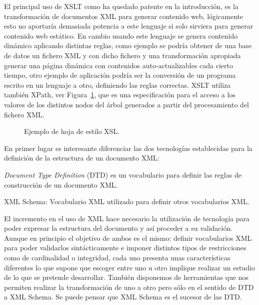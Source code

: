 \begin{description}
El principal uso de XSLT como ha quedado patente en la introducción, es la transformación
de documentos XML para generar contenido web, lógicamente esto no aportaría demasiada potencia
a este lenguaje si solo sirviera para generar contenido web estático. En cambio usando
este lenguaje se genera contenido dinámico aplicando distintas reglas, como ejemplo se
podría obtener de una base de datos un fichero XML y con dicho fichero y una transformación
apropiada generar una página dinámica con contenidos auto-actualizables cada cierto tiempo, otro 
ejemplo de aplicación podría ser la conversión de un programa escrito en un lenguaje a otro, definiendo las reglas correctas. 
XSLT utiliza también \gls{XPath}, ver Figura~\ref{fig:xsl-example}, que es una especificación
para el acceso a los valores de los distintos nodos del árbol generados a partir del procesamiento
del fichero XML. 

\begin{figure}[!hbp]
\centering

\caption{Ejemplo de hoja de estilo XSL.}
\label{fig:xsl-example}
\end{figure}


\item[\gls{XML Schema}~\cite{XMLSchema}.] En primer lugar es interesante diferenciar las dos
tecnologías establecidas para la definición de la estructura de un documento
XML: \begin{inparaenum}
     \item \textit{Document Type Definition} (\gls{DTD}) es un vocabulario para definir las
     reglas de construcción de un documento XML.     
     \item XML Schema: Vocabulario XML utilizado para definir otros vocabularios
     XML.  
     \end{inparaenum}

El incremento en el uso de \gls{XML} hace necesario la utilización de tecnología para poder
expresar la estructura del documento y así proceder a su validación. Aunque en principio el objetivo de ambos es el mismo: 
definir vocabularios XML para poder validarlos sintácticamente e imponer distintos tipos de 
restricciones como de cardinalidad o integridad, cada uno presenta unas características diferentes 
lo que supone que escoger entre uno u otro implique realizar un estudio de lo que se pretende desarrollar.
También disponemos de herramientas que nos permiten realizar la transformación de uno a
otro pero sólo en el sentido de DTD a XML Schema. Se puede pensar que XML Schema es el
sucesor de las DTD.


\end{description}
